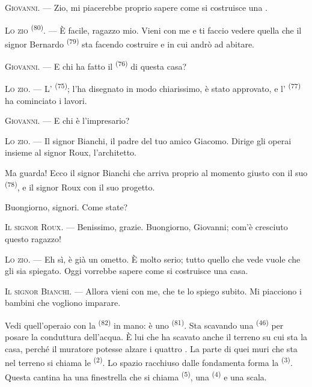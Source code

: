 \VUsaut{6.0mm}
\VUsaut{1.4mm}
\VUsaut{2.2mm}

\VUsaut{3.0mm}

\textsc{Giovanni}. --- Zio, mi piacerebbe proprio sapere come si costruisce una
.

\textsc{Lo zio} \textsuperscript{(80)}. --- È facile, ragazzo mio. Vieni con me e ti
faccio vedere quella che il signor Bernardo \textsuperscript{(79)} sta facendo
costruire e in cui andrò ad abitare.

\textsc{Giovanni}. --- E chi ha fatto il  \textsuperscript{(76)} di
questa casa?

\textsc{Lo zio}. --- L' \textsuperscript{(75)}; l'ha disegnato in
modo chiarissimo, è stato approvato, e l'
\textsuperscript{(77)} ha cominciato i lavori.

\textsc{Giovanni}. --- E chi è l'impresario?

\textsc{Lo zio}. --- Il signor Bianchi, il padre del tuo amico Giacomo. Dirige gli
operai insieme al signor Roux, l'architetto.

Ma guarda! Ecco il signor Bianchi che arriva proprio al momento giusto con il suo
 \textsuperscript{(78)}, e il signor Roux con il suo progetto.

Buongiorno, signori. Come state?

\textsc{Il signor Roux}. --- Benissimo, grazie. Buongiorno, Giovanni; com'è cresciuto
questo ragazzo!

\textsc{Lo zio}. --- Eh sì, è già un ometto. È molto serio; tutto quello che vede vuole
che gli sia spiegato. Oggi vorrebbe sapere come si costruisce una casa.

\VUsaut{3.0mm}

\textsc{Il signor Bianchi}. --- Allora vieni con me, che te lo spiego subito. Mi
piacciono i bambini che vogliono imparare.

Vedi quell'operaio con la  \textsuperscript{(82)} in mano: è uno
 \textsuperscript{(81)}. Sta scavando una 
\textsuperscript{(46)} per posare la conduttura dell'acqua. È lui che ha scavato anche
il terreno su cui sta la casa, perché il muratore potesse alzare i quattro
. La parte di quei muri che sta nel terreno si chiama le
 \textsuperscript{(2)}. Lo spazio racchiuso dalle fondamenta forma
la  \textsuperscript{(3)}. Questa cantina ha una finestrella che si
chiama  \textsuperscript{(5)}, una 
\textsuperscript{(4)} e una scala.

